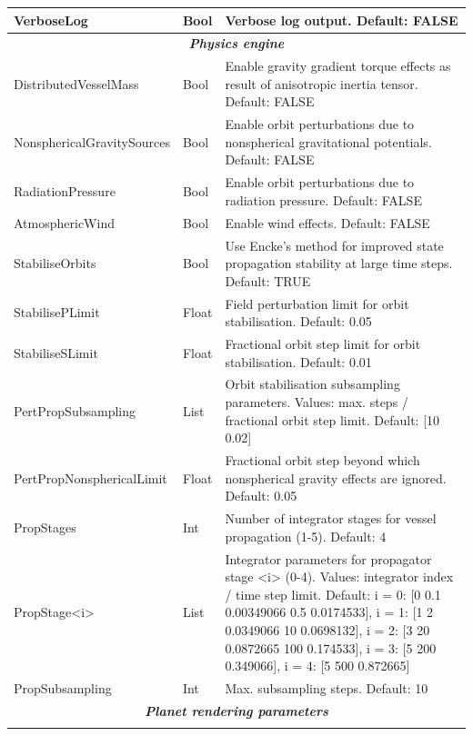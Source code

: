 \documentclass[Orbiter User Manual.tex]{subfiles}
\begin{document}
\begin{longtable}{ |p{}|p{}|p{}| }
	\hline\rule{0pt}{2ex}
	VerboseLog & Bool & Verbose log output. Default: FALSE\\
	\hline
	\multicolumn{3}{|c|}{\rule{0pt}{2ex}\textbf{\textit{Physics engine}}}\\
	\hline\rule{0pt}{2ex}
	DistributedVesselMass & Bool & Enable gravity gradient torque effects as result of anisotropic inertia tensor. Default: FALSE\\
	\hline\rule{0pt}{2ex}
	NonsphericalGravitySources & Bool & Enable orbit perturbations due to nonspherical gravitational potentials. Default: FALSE\\
	\hline\rule{0pt}{2ex}
	RadiationPressure & Bool & Enable orbit perturbations due to radiation pressure. Default: FALSE\\
	\hline\rule{0pt}{2ex}
	AtmosphericWind & Bool & Enable wind effects. Default: FALSE\\
	\hline\rule{0pt}{2ex}
	StabiliseOrbits & Bool & Use Encke's method for improved state propagation stability at large time steps. Default: TRUE\\
	\hline\rule{0pt}{2ex}
	StabilisePLimit & Float & Field perturbation limit for orbit stabilisation. Default: 0.05\\
	\hline\rule{0pt}{2ex}
	StabiliseSLimit & Float & Fractional orbit step limit for orbit stabilisation. Default: 0.01\\
	\hline\rule{0pt}{2ex}
	PertPropSubsampling & List & Orbit stabilisation subsampling parameters. Values: max. steps / fractional orbit step limit. Default: [10 0.02]\\
	\hline\rule{0pt}{2ex}
	PertPropNonsphericalLimit & Float & Fractional orbit step beyond which nonspherical gravity effects are ignored. Default: 0.05\\
	\hline\rule{0pt}{2ex}
	PropStages & Int & Number of integrator stages for vessel propagation (1-5). Default: 4\\
	\hline\rule{0pt}{2ex}
	PropStage<i> & List & Integrator parameters for propagator stage <i> (0-4). Values: integrator index / time step limit. Default: i = 0: [0 0.1 0.00349066 0.5 0.0174533], i = 1: [1 2 0.0349066 10 0.0698132], i = 2: [3 20 0.0872665 100 0.174533], i = 3: [5 200 0.349066], i = 4: [5 500 0.872665]\\
	\hline\rule{0pt}{2ex}
	PropSubsampling & Int & Max. subsampling steps. Default: 10\\
	\hline
	\multicolumn{3}{|c|}{\rule{0pt}{2ex}\textbf{\textit{Planet rendering parameters}}}\\
	\hline\rule{0pt}{2ex}

\end{longtable}
\end{document}
